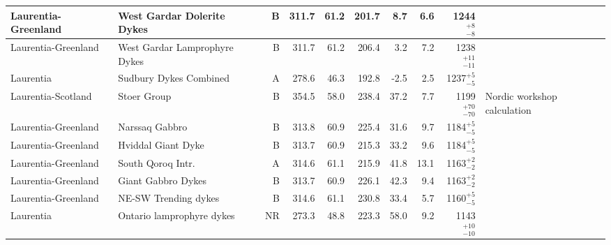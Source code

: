 \begin{longtable}{p{1 in}p{1 in}rrrrrrrp{1.5 in}}
           Laurentia-Greenland &                       West Gardar Dolerite Dykes &      B &     311.7 &      61.2 & 201.7 &   8.7 &       6.6 &     1244$^{+8}_{-8}$ &                                  \cite{Piper1977b} \\ \hline
           Laurentia-Greenland &                    West Gardar Lamprophyre Dykes &      B &     311.7 &      61.2 & 206.4 &   3.2 &       7.2 &   1238$^{+11}_{-11}$ &                                  \cite{Piper1977b} \\ \hline
                     Laurentia &                           Sudbury Dykes Combined &      A &     278.6 &      46.3 & 192.8 &  -2.5 &       2.5 &     1237$^{+5}_{-5}$ &                                 \cite{Palmer1977a} \\ \hline
            Laurentia-Scotland &                                      Stoer Group &      B &     354.5 &      58.0 & 238.4 &  37.2 &       7.7 &   1199$^{+70}_{-70}$ &                        Nordic workshop calculation \\ \hline
           Laurentia-Greenland &                                   Narssaq Gabbro &      B &     313.8 &      60.9 & 225.4 &  31.6 &       9.7 &     1184$^{+5}_{-5}$ &                                  \cite{Piper1977a} \\ \hline
           Laurentia-Greenland &                               Hviddal Giant Dyke &      B &     313.7 &      60.9 & 215.3 &  33.2 &       9.6 &     1184$^{+5}_{-5}$ &                                  \cite{Piper1977a} \\ \hline
           Laurentia-Greenland &                                South Qoroq Intr. &      A &     314.6 &      61.1 & 215.9 &  41.8 &      13.1 &     1163$^{+2}_{-2}$ &                                  \cite{Piper1992a} \\ \hline
           Laurentia-Greenland &                               Giant Gabbro Dykes &      B &     313.7 &      60.9 & 226.1 &  42.3 &       9.4 &     1163$^{+2}_{-2}$ &                                  \cite{Piper1977a} \\ \hline
           Laurentia-Greenland &                             NE-SW Trending dykes &      B &     314.6 &      61.1 & 230.8 &  33.4 &       5.7 &     1160$^{+5}_{-5}$ &                                  \cite{Piper1992a} \\ \hline
                     Laurentia &                        Ontario lamprophyre dykes &      NR &     273.3 &      48.8 & 223.3 &  58.0 &       9.2 &   1143$^{+10}_{-10}$ &                                 \cite{Piispa2018a} \\ \hline

\end{longtable}
